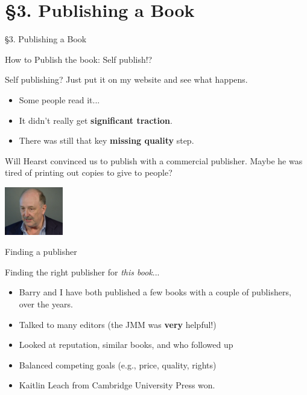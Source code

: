 \documentclass{beamer}
\newcommand{\mysection}[2]{\section{\S#1. #2}%
\begin{frame}{}
\vfill
\begin{center}
\hrulefill
\vfill
\Huge\sc \S#1. #2
\vfill
\hrulefill
\end{center}
\vfill
\end{frame}}
\begin{document}
\mysection{3}{Publishing a Book}

\begin{frame}{How to Publish the book:  Self publish!?}
  \begin{block}{Self publishing?}
    Just put it on my website and see what happens.
    \begin{itemize}
      \item Some people read it...
      \item It didn't really get \textbf{significant traction}.
      \item There was still that key \textbf{missing quality} step.
    \end{itemize}
  \end{block}
  \vfill
  Will Hearst convinced us to publish with a commercial publisher.
  Maybe he was tired of printing out copies to give to people?

\begin{flushright}

  \includegraphics[width=1in]{pics/will-msri}
\end{flushright}

\end{frame}

\begin{frame}{Finding a publisher}
  \begin{block}{Finding the right publisher for {\em this book}...}
    \begin{itemize}
      \item Barry and I have both published a few books with a couple of publishers, over the years.
      \item Talked to many editors (the JMM was \textbf{very} helpful!)
      \item Looked at reputation, similar books, and who followed up
      \item Balanced competing goals (e.g., price, quality, rights)
      \item Kaitlin Leach from Cambridge University Press won.
    \end{itemize}
  \end{block}
\end{frame}
\end{document}
